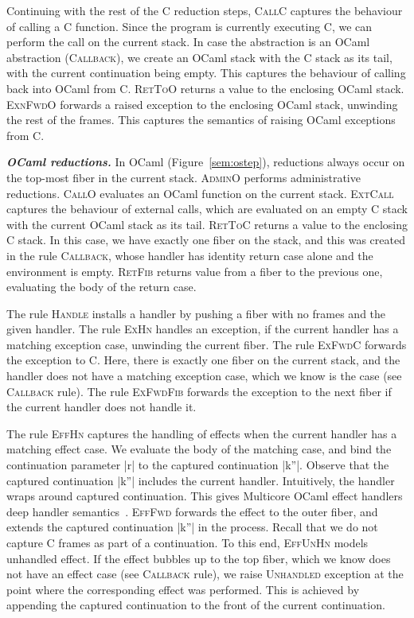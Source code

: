 \documentclass[sigplan,10pt,review,anonymous]{acmart}\settopmatter{printfolios=true,printccs=false,printacmref=false}
\begin{document}
Continuing with the rest of the C reduction steps, \textsc{CallC} captures the
behaviour of calling a C function. Since the program is currently executing C,
we can perform the call on the current stack. In case the abstraction is an
OCaml abstraction (\textsc{Callback}), we create an OCaml stack with the C
stack as its tail, with the current continuation being empty. This captures the
behaviour of calling back into OCaml from C. \textsc{RetToO} returns a value to
the enclosing OCaml stack. \textsc{ExnFwdO} forwards a raised exception to the
enclosing OCaml stack, unwinding the rest of the frames. This captures the
semantics of raising OCaml exceptions from C.

\textbf{\textit{OCaml reductions.}} In OCaml (Figure~\ref{sem:ostep}),
reductions always occur on the top-most fiber in the current stack.
\textsc{AdminO} performs administrative reductions. \textsc{CallO} evaluates an
OCaml function on the current stack. \textsc{ExtCall} captures the behaviour of
external calls, which are evaluated on an empty C stack with the current OCaml
stack as its tail. \textsc{RetToC} returns a value to the enclosing C stack. In
this case, we have exactly one fiber on the stack, and this was created in the
rule \textsc{Callback}, whose handler has identity return case alone and the
environment is empty. \textsc{RetFib} returns value from a fiber to the
previous one, evaluating the body of the return case.

The rule \textsc{Handle} installs a handler by pushing a fiber with no frames
and the given handler. The rule \textsc{ExHn} handles an exception, if the
current handler has a matching exception case, unwinding the current fiber. The
rule \textsc{ExFwdC} forwards the exception to C. Here, there is exactly one
fiber on the current stack, and the handler does not have a matching exception
case, which we know is the case (see \textsc{Callback} rule). The rule
\textsc{ExFwdFib} forwards the exception to the next fiber if the current
handler does not handle it.

The rule \textsc{EffHn} captures the handling of effects when the current
handler has a matching effect case. We evaluate the body of the matching case,
and bind the continuation parameter |r| to the captured continuation |k''|.
Observe that the captured continuation |k''| includes the current handler.
Intuitively, the handler wraps around captured continuation. This gives
Multicore OCaml effect handlers deep handler semantics~\cite{Hillerstrom20}.
\textsc{EffFwd} forwards the effect to the outer fiber, and extends the
captured continuation |k''| in the process. Recall that we do not capture C
frames as part of a continuation. To this end, \textsc{EffUnHn} models
unhandled effect. If the effect bubbles up to the top fiber, which we know does
not have an effect case (see \textsc{Callback} rule), we raise
\textsc{Unhandled} exception at the point where the corresponding effect was
performed. This is achieved by appending the captured continuation to the front
of the current continuation.
\end{document}
